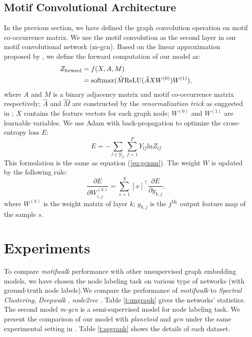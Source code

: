 \documentclass{article}
\theoremstyle{definition}
\begin{document}
\subsection{Motif Convolutional Architecture}

In the previous section, we have defined the graph convolution
operation on motif co-occurrence matrix. We use the motif convolution
as the second layer in our motif convolutional network (m-gcn). Based on the 
linear approximation proposed by \citeauthor{gcn}, we define the forward
computation of our model as:
\begin{equation} 
    \begin{aligned}
    Z_{\scalebox{0.75}{forward}} &= f(X,A,M) \\
    &= \mbox{softmax}(\hat{M} \mbox{ReLU}(\hat{A}XW^{(0)})W^{(1)}),
    \end{aligned}
    \label{eq:mforward}
\end{equation}
where $A$ and $M$ is a binary adjacency matrix and motif co-occurrence
matrix respectively; $\hat{A}$ and $\hat{M}$ are constructed by the
\emph{renormalization trick} as suggested in \cite{gcn}; $X$ contains
the feature vectors for each graph node; $W^{(0)}$ and $W^{(1)}$ are
learnable variables. We use Adam \cite{adam} with back-propagation 
to optimize the cross-entropy loss $E$:
\begin{equation}
	E = -\sum_{l \in \mathcal{Y}_L} \sum^F_{f=1} Y_{lf}\mbox{ln} Z_{lf}
	\label{eq:mloss}
\end{equation}
This formulation is the same as equation (\ref{eq:gcnnn}). The weight $W$ is updated
by the following rule:
\begin{equation}
	\frac{\partial E}{\partial W^{(k)}_{i,j}} = \sum^S_{s=1} [x]^\top \frac{\partial E}{\partial y_{k,j}},
	\label{eq:mback}
\end{equation}
where $W^{(k)}$ is the weight matrix of layer $k$; $y_{k,j}$ is the 
$j^{\scalebox{0.75}{th}}$ output feature map of the sample $s$. 

\section{Experiments}

To compare \emph{motifwalk} performance with other unsupervised graph
embedding models, we have chosen the node labeling task on various
type of networks (with ground-truth node labels).We
compare the performance of \emph{motifwalk} to \emph{Spectral Clustering}, 
\emph{Deepwalk} \cite{deepwalk}, \emph{node2vec} \cite{node2vec}. 
Table \ref{t:ungraph} gives the networks' statistics. The second model 
\emph{m-gcn} is a semi-supervised model for node labeling task. 
We present the comparison of our model with \emph{planetoid} and
\emph{gcn} under the same experimental setting in \cite{gcn}. 
Table \ref{t:segraph} shows the details of each dataset.
\end{document}

